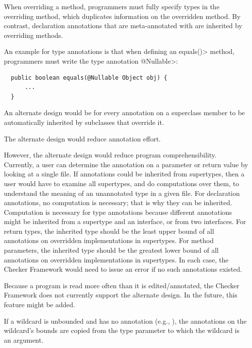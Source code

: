 
When overriding a method, programmers must fully specify types in the overriding
method, which duplicates information on the overridden method.
By contrast, declaration annotations that are meta-annotated with
 are inherited by overriding methods.

An example for type annotations is that when defining an \<equals()>
method, programmers must write the type annotation \<@Nullable>:

\begin{Verbatim}
  public boolean equals(@Nullable Object obj) {
      ...
  }
\end{Verbatim}

An alternate design would be for every annotation on a superclass member to
be automatically inherited by subclasses that override it.

The alternate design would reduce annotation effort.

However, the alternate design would reduce program comprehensibility.
Currently, a user can determine the annotation on a parameter or return
value by looking at a single file.  If annotations could be inherited from
supertypes, then a user would have to examine all supertypes, and do
computations over them, to understand the meaning of an unannotated type in
a given file.
For declaration annotations, no computation is necessary; that is why they
can be inherited.
Computation is necessary for type annotations because different annotations might be inherited
from a supertype and an interface, or from two interfaces.  For return
types, the inherited type should be the least upper bound of all
annotations on overridden implementations in supertypes.  For method
parameters, the inherited type should be the greatest lower bound of all
annotations on overridden implementations in supertypes.  In each case, the
Checker Framework would need to issue an error if no such annotations existed.

Because a program is read more often than it is edited/annotated, the
Checker Framework does not currently support the alternate design.  In the
future, this feature might be added.



If a wildcard is unbounded and has no annotation (e.g., ),
the annotations on the wildcard's bounds are copied from the type parameter
to which the wildcard is an argument.

